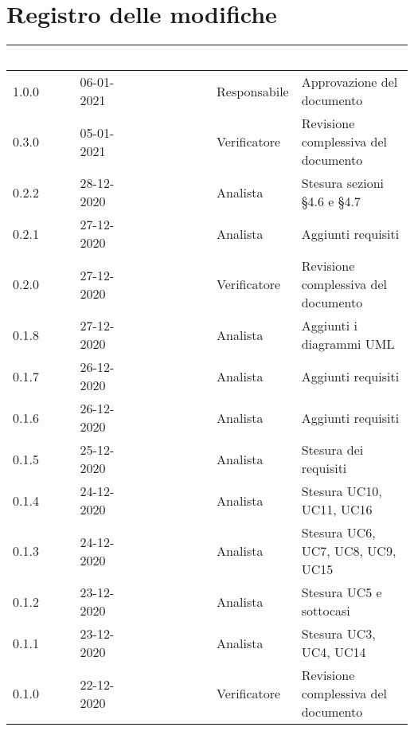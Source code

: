 \section*{Registro delle modifiche}
{
\setcounter{table}{-1}
{
\renewcommand{\arraystretch}{1.5}
\centering
\begin{longtable}{C{1.7cm} C{2.5cm} C{3.2cm} C{2.7cm} C{4.8cm}}
\textcolor{white}{\textbf{Versione}}&
\textcolor{white}{\textbf{Data}}&
\textcolor{white}{\textbf{Nominativo}}&
\textcolor{white}{\textbf{Ruolo}}&
\textcolor{white}{\textbf{Descrizione}}\\	
\endhead

1.0.0 & 06-01-2021 & \BM{} & Responsabile & Approvazione del documento \\

0.3.0 & 05-01-2021 & \PA{} & Verificatore & Revisione complessiva del documento \\

0.2.2 & 28-12-2020 & \BM{} & Analista & Stesura sezioni §4.6 e §4.7\\
0.2.1 & 27-12-2020 & \SG{} & Analista & Aggiunti requisiti\\

0.2.0 & 27-12-2020 & \RA{} & Verificatore & Revisione complessiva del documento \\

0.1.8 & 27-12-2020 & \SP{} & Analista & Aggiunti i diagrammi UML\\
0.1.7 & 26-12-2020 & \SP{} & Analista & Aggiunti requisiti\\
0.1.6 & 26-12-2020 & \BM{} & Analista & Aggiunti requisiti\\
0.1.5 & 25-12-2020 & \SG{} & Analista & Stesura dei requisiti \\
0.1.4 & 24-12-2020 & \SP{} & Analista & Stesura UC10, UC11, UC16\\
0.1.3 & 24-12-2020 & \SG{} & Analista & Stesura UC6, UC7, UC8, UC9, UC15\\
0.1.2 & 23-12-2020 & \SP{} & Analista & Stesura UC5 e sottocasi\\

0.1.1 & 23-12-2020 & \BM{} & Analista & Stesura UC3, UC4, UC14\\

0.1.0 & 22-12-2020 & \PA{} & Verificatore & Revisione complessiva del documento \\


\end{longtable}}}
